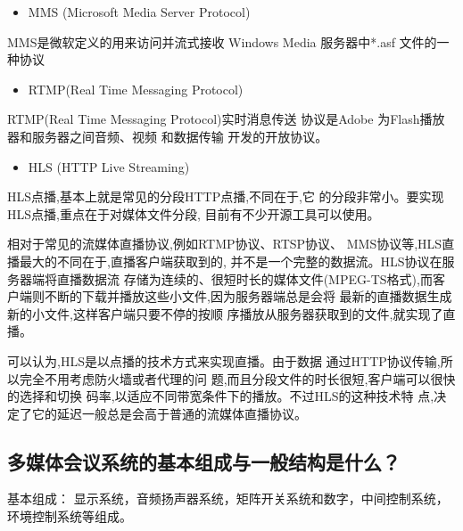 \documentclass[UTF8,a4paper,AutoFakeBold,AutoFakeSlant]{ctexart}
\begin{document}
\begin{itemize}
	\item MMS (Microsoft Media Server Protocol)
\end{itemize}

MMS是微软定义的用来访问并流式接收 Windows
Media 服务器中*.asf 文件的一种协议

\begin{itemize}
	\item RTMP(Real Time Messaging Protocol)
\end{itemize}

RTMP(Real Time Messaging Protocol)实时消息传送
协议是Adobe 为Flash播放器和服务器之间音频、视频
和数据传输 开发的开放协议。

\begin{itemize}
	\item HLS (HTTP Live Streaming)
\end{itemize}

HLS点播,基本上就是常见的分段HTTP点播,不同在于,它
的分段非常小。要实现HLS点播,重点在于对媒体文件分段,
目前有不少开源工具可以使用。

相对于常见的流媒体直播协议,例如RTMP协议、RTSP协议、
MMS协议等,HLS直播最大的不同在于,直播客户端获取到的,
并不是一个完整的数据流。HLS协议在服务器端将直播数据流
存储为连续的、很短时长的媒体文件(MPEG-TS格式),而客
户端则不断的下载并播放这些小文件,因为服务器端总是会将
最新的直播数据生成新的小文件,这样客户端只要不停的按顺
序播放从服务器获取到的文件,就实现了直播。

可以认为,HLS是以点播的技术方式来实现直播。由于数据
通过HTTP协议传输,所以完全不用考虑防火墙或者代理的问
题,而且分段文件的时长很短,客户端可以很快的选择和切换
码率,以适应不同带宽条件下的播放。不过HLS的这种技术特
点,决定了它的延迟一般总是会高于普通的流媒体直播协议。




\subsection{多媒体会议系统的基本组成与一般结构是什么？}

基本组成：
显示系统，音频扬声器系统，矩阵开关系统和数字，中间控制系统，环境控制系统等组成。
\end{document}
